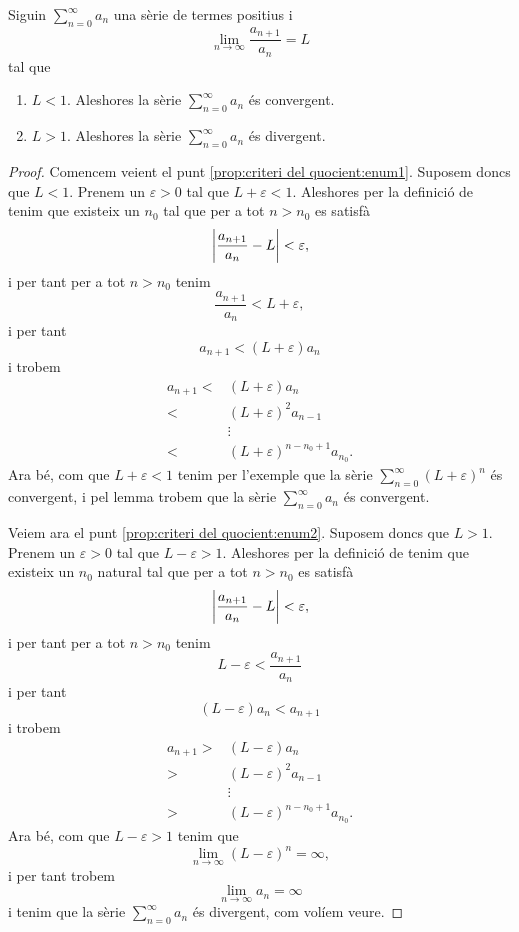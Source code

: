 \documentclass[../Apunts.tex]{subfiles}
\begin{document}
	\begin{proposition}
		\label{prop:criteri del quocient}
		Siguin \(\sum_{n=0}^{\infty}a_{n}\) una sèrie de termes positius i
		\[\lim_{n\to\infty}\frac{a_{n+1}}{a_{n}}=L\]
		tal que
		\begin{enumerate}
			\item\label{prop:criteri del quocient:enum1} \(L<1\). Aleshores la sèrie \(\sum_{n=0}^{\infty}a_{n}\) és convergent.
			\item\label{prop:criteri del quocient:enum2} \(L>1\). Aleshores la sèrie \(\sum_{n=0}^{\infty}a_{n}\) és divergent.
		\end{enumerate}
		\begin{proof}
			Comencem veient el punt \eqref{prop:criteri del quocient:enum1}. Suposem doncs que \(L<1\). Prenem un \(\varepsilon>0\) tal que \(L+\varepsilon<1\). Aleshores per la definició de  tenim que existeix un \(n_{0}\) tal que per a tot \(n>n_{0}\) es satisfà
			\[\abs{\frac{a_{n+1}}{a_{n}}-L}<\varepsilon,\]
			i per tant per a tot \(n>n_{0}\) tenim
			\[\frac{a_{n+1}}{a_{n}}<L+\varepsilon,\]
			i per tant
			\[a_{n+1}<(L+\varepsilon)a_{n}\]
			i trobem
			\begin{align*}
				a_{n+1}<&(L+\varepsilon)a_{n}\\
				<&(L+\varepsilon)^{2}a_{n-1}\\
				&\vdots\\
				<&(L+\varepsilon)^{n-n_{0}+1}a_{n_{0}}.
			\end{align*}
			Ara bé, com que \(L+\varepsilon<1\) tenim per l'exemple  que la sèrie \(\sum_{n=0}^{\infty}(L+\varepsilon)^{n}\) és convergent, i pel lemma  trobem que la sèrie \(\sum_{n=0}^{\infty}a_{n}\) és convergent.
			
			Veiem ara el punt \eqref{prop:criteri del quocient:enum2}. Suposem doncs que \(L>1\). Prenem un \(\varepsilon>0\) tal que \(L-\varepsilon>1\). Aleshores per la definició de  tenim que existeix un \(n_{0}\) natural tal que per a tot \(n>n_{0}\) es satisfà
			\[\abs{\frac{a_{n+1}}{a_{n}}-L}<\varepsilon,\]
			i per tant per a tot \(n>n_{0}\) tenim
			\[L-\varepsilon<\frac{a_{n+1}}{a_{n}}\]
			i per tant
			\[(L-\varepsilon)a_{n}<a_{n+1}\]
			i trobem
			\begin{align*}
				a_{n+1}>&(L-\varepsilon)a_{n}\\
				>&(L-\varepsilon)^{2}a_{n-1}\\
				&\vdots\\
				>&(L-\varepsilon)^{n-n_{0}+1}a_{n_{0}}.
			\end{align*}
			Ara bé, com que \(L-\varepsilon>1\) tenim que
			\[\lim_{n\to\infty}(L-\varepsilon)^{n}=\infty,\]
			i per tant trobem
			\[\lim_{n\to\infty}a_{n}=\infty\]
			i tenim que la sèrie \(\sum_{n=0}^{\infty}a_{n}\) és divergent, com volíem veure.
		\end{proof}
	\end{proposition}
\end{document}
